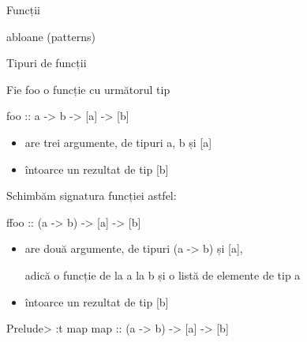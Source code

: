 \documentclass[xcolor=pdftex,romanian,colorlinks]{beamer}
\begin{document}
\begin{section}{Funcții}
\begin{frame}[fragile]{\Sh abloane (patterns)}
\begin{itemize}
\end{itemize}
\end{frame}
\begin{frame}[fragile]{Tipuri de funcții}

Fie {foo} o funcție cu următorul tip


\begin{asciihs}
foo :: a -> b -> [a] -> [b]
\end{asciihs}


\begin{itemize}

\item are trei argumente, de tipuri a, b și [a]
\item întoarce un rezultat de tip [b]
\end{itemize}
\pause

Schimbăm signatura funcției astfel:

\begin{asciihs}
ffoo :: (a -> b) -> [a] -> [b]
\end{asciihs}



\begin{itemize}

\item are două argumente, de tipuri (a -> b) și [a],

adică o funcție de la a la b și o listă de elemente de tip a
\item întoarce un rezultat de tip [b]
\end{itemize}
\pause
\begin{asciihs}
Prelude> :t map
map :: (a -> b) -> [a] -> [b]

\end{asciihs}
\end{frame}



\end{section}
\end{document}
